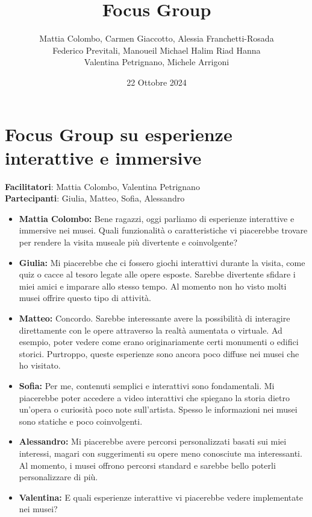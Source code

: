 \documentclass{article}
\title{\textbf{Focus Group}}
\author{Mattia Colombo, Carmen Giaccotto, Alessia Franchetti-Rosada \\Federico Previtali, Manoueil Michael Halim Riad Hanna \\ Valentina Petrignano, Michele Arrigoni}
\date{22 Ottobre 2024}
\begin{document}
\maketitle

\section{Focus Group su esperienze interattive e immersive}
\textbf{Facilitatori}: Mattia Colombo, Valentina Petrignano \\
\textbf{Partecipanti}: Giulia, Matteo, Sofia, Alessandro

\begin{itemize}
    \item \textbf{Mattia Colombo:} Bene ragazzi, oggi parliamo di esperienze interattive e immersive nei musei. Quali funzionalità o caratteristiche vi piacerebbe trovare per rendere la visita museale più divertente e coinvolgente?

    \item \textbf{Giulia:} Mi piacerebbe che ci fossero giochi interattivi durante la visita, come quiz o cacce al tesoro legate alle opere esposte. Sarebbe divertente sfidare i miei amici e imparare allo stesso tempo. Al momento non ho visto molti musei offrire questo tipo di attività.
    
    \item \textbf{Matteo:} Concordo. Sarebbe interessante avere la possibilità di interagire direttamente con le opere attraverso la realtà aumentata o virtuale. Ad esempio, poter vedere come erano originariamente certi monumenti o edifici storici. Purtroppo, queste esperienze sono ancora poco diffuse nei musei che ho visitato.

    \item \textbf{Sofia:} Per me, contenuti semplici e interattivi sono fondamentali. Mi piacerebbe poter accedere a video interattivi che spiegano la storia dietro un’opera o curiosità poco note sull’artista. Spesso le informazioni nei musei sono statiche e poco coinvolgenti.

    \item \textbf{Alessandro:} Mi piacerebbe avere percorsi personalizzati basati sui miei interessi, magari con suggerimenti su opere meno conosciute ma interessanti. Al momento, i musei offrono percorsi standard e sarebbe bello poterli personalizzare di più.

    \item \textbf{Valentina:} E quali esperienze interattive vi piacerebbe vedere implementate nei musei?


\end{itemize}
\end{document}
